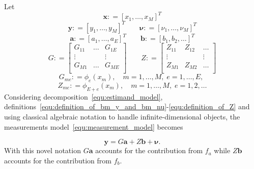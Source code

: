 \documentclass[10pt,twocolumn,twoside]{IEEEtran}					%
\theoremstyle	{plain}
\newcommand{\DefinedAs}			[0]	{\mathrel{\mathop:}=}
\begin{document}
Let
%
\begin{equation}
	\bm{x} \DefinedAs \left[ x_{1}, \ldots, x_{M} \right]^{T}
	\label{equ:definition_of_bm_x}
\end{equation}
%
\begin{equation}
	\bm{y} \DefinedAs \left[ y_{1}, \ldots, y_{M} \right]^{T}
	\qquad
	\bm{\nu} \DefinedAs \left[ \nu_{1}, \ldots, \nu_{M} \right]^{T}
	\label{equ:definition_of_bm_y_and_bm_nu}
\end{equation}
%
\begin{equation}
	\bm{a} \DefinedAs \left[ a_{1}, \ldots, a_{E} \right]^{T}
	\qquad
	\bm{b} \DefinedAs \left[ b_{1}, b_{2}, \ldots \right]^{T}
	\label{equ:definition_of_bm_a_and_bm_b}
\end{equation}
%
\begin{equation}
	G
	\DefinedAs
	\begin{bmatrix}
		G_{11} & \ldots & G_{1E} \\
		\vdots & & \vdots \\
		G_{M1} & \ldots & G_{ME} \\
	\end{bmatrix}
	\qquad
	Z
	\DefinedAs
	\begin{bmatrix}
		Z_{11} & Z_{12} & \ldots \\
		\vdots & & \vdots \\
		Z_{M1} & Z_{M2} & \ldots \\
	\end{bmatrix}
	\label{equ:definition_of_G_and_Z}
\end{equation}
%
\begin{equation}
	G_{me}
	\DefinedAs
	\phi_{e}(x_{m}),
	\quad
	m = 1, \ldots, M, \;
	e = 1, \ldots, E, \;
	\label{equ:definition_of_G}
\end{equation}
%
\begin{equation}
	Z_{me}
	\DefinedAs
	\phi_{E+e}(x_{m}),
	\quad
	m = 1, \ldots, M, \;
	e = 1, 2, \ldots 
	\label{equ:definition_of_Z}
\end{equation}
%
Considering decomposition~\eqref{equ:estimand_model}, definitions~\eqref{equ:definition_of_bm_y_and_bm_nu}-\eqref{equ:definition_of_Z} and using classical algebraic notation to handle infinite-dimensional objects, the measurements model~\eqref{equ:measurement_model} becomes

\begin{equation}
	\bm{y} = G \bm{a} + Z \bm{b} + \bm{\nu}.
	\label{equ:measurement_model_vector_form}
\end{equation}
%
With this novel notation $G \bm{a}$ accounts for the contribution from $f_{a}$ while $Z \bm{b}$ accounts for the contribution from $f_{b}$.
\end{document}
